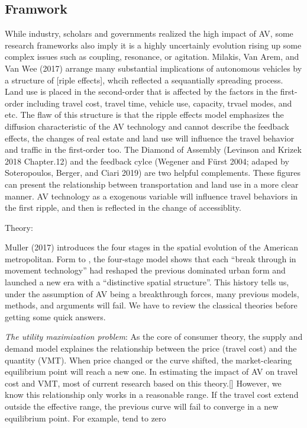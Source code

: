 \documentclass[12pt,]{article}
\begin{document}
\hypertarget{framwork}{%
\subsection{Framwork}\label{framwork}}

While industry, scholars and governments realized the high impact of AV,
some research frameworks also imply it is a highly uncertainly evolution
rising up some complex issues such as coupling, resonance, or agitation.
Milakis, Van Arem, and Van Wee (2017) arrange many substantial
implications of autonomous vehicles by a structure of {[}riple
effects{]}, whcih reflected a sequantially spreading process. Land use
is placed in the second-order that is affected by the factors in the
first-order including travel cost, travel time, vehicle use, capacity,
trvael modes, and etc. The flaw of this structure is that the ripple
effects model emphasizes the diffusion characteristic of the AV
technology and cannot describe the feedback effects, the changes of real
estate and land use will influence the travel behavior and traffic in
the first-order too. The Diamond of Assembly (Levinson and Krizek 2018
Chapter.12) and the feedback cylce (Wegener and Fürst 2004; adaped by
Soteropoulos, Berger, and Ciari 2019) are two helpful complements. These
figures can present the relationship between transportation and land use
in a more clear manner. AV technology as a exogenous variable will
influence travel behaviors in the first ripple, and then is reflected in
the change of accessiblity.

Theory:

Muller (2017) introduces the four stages in the spatial evolution of the
American metropolitan. Form to , the four-stage model shows that each
``break through in movement technology'' had reshaped the previous
dominated urban form and launched a new era with a ``distinctive spatial
structure''. This history tells us, under the assumption of AV being a
breakthrough forces, many previous models, methods, and arguments will
fail. We have to review the classical theories before getting some quick
answers.

\emph{The utility maximization problem}: As the core of consumer theory,
the supply and demand model explaines the relationship between the price
(travel cost) and the quantity (VMT). When price changed or the curve
shifted, the market-clearing equilibrium point will reach a new one. In
estimating the impact of AV on travel cost and VMT, most of current
research based on this theory.{[}{]} However, we know this relationship
only works in a reasonable range. If the travel cost extend outside the
effective range, the previous curve will fail to converge in a new
equilibrium point. For example, tend to zero
\end{document}

